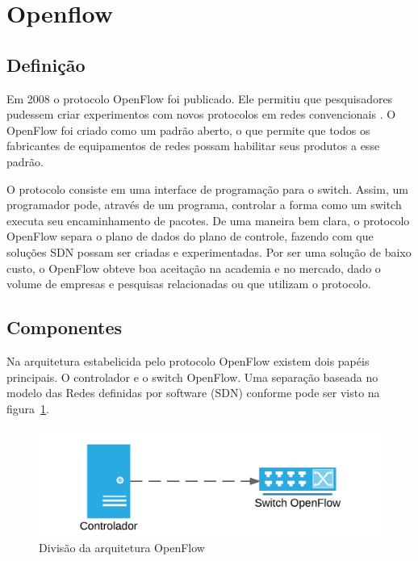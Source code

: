 \section{Openflow}



\subsection{Definição}

Em 2008 o protocolo OpenFlow foi publicado. Ele permitiu que pesquisadores
pudessem criar experimentos com novos protocolos em redes convencionais
\citep{nick2008openflow}.
O OpenFlow foi criado como um padrão aberto, o que permite que todos os 
fabricantes de equipamentos de redes possam habilitar seus produtos a esse 
padrão.

O protocolo consiste em uma interface de programação para o switch. 
Assim, um programador pode, através de um programa, controlar a forma como 
um switch executa seu encaminhamento de pacotes. 
De uma maneira bem clara, o protocolo OpenFlow separa o plano de dados
do plano de controle, fazendo com que soluções SDN possam ser criadas 
e experimentadas.
Por ser uma solução de baixo custo, o OpenFlow obteve boa aceitação na 
academia e no mercado, dado o volume de empresas e pesquisas relacionadas
ou que utilizam o protocolo.

\subsection{Componentes}

Na arquitetura estabelicida pelo protocolo OpenFlow existem dois papéis
principais.
O controlador e o switch OpenFlow. 
Uma separação baseada no modelo das Redes definidas por software (SDN)
conforme pode ser visto na figura~\ref{fig:controller-secure-switch}.

\begin{figure}[h!]
    \centering
    \label{fig:controller-secure-switch}
    \includegraphics[width=\linewidth]{img/controller-secure-switch}
    \caption{Divisão da arquitetura OpenFlow}
\end{figure}

